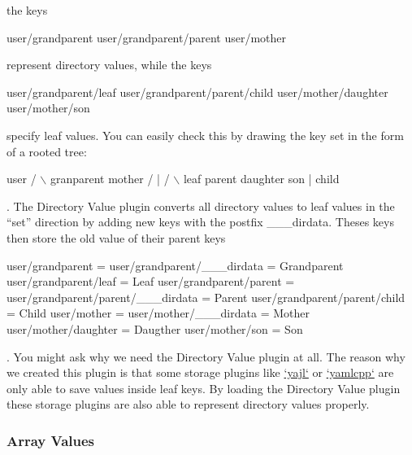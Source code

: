 the keys


\begin{DoxyCode}
user/grandparent
user/grandparent/parent
user/mother
\end{DoxyCode}


represent directory values, while the keys


\begin{DoxyCode}
user/grandparent/leaf
user/grandparent/parent/child
user/mother/daughter
user/mother/son
\end{DoxyCode}


specify leaf values. You can easily check this by drawing the key set in the form of a rooted tree\+:


\begin{DoxyCode}
             user
      /               \(\backslash\)
  granparent        mother
  /      |          /    \(\backslash\)
leaf  parent    daughter son
         |
       child
\end{DoxyCode}


. The Directory Value plugin converts all directory values to leaf values in the “set” direction by adding new keys with the postfix {\ttfamily \+\_\+\+\_\+\+\_\+dirdata}. Theses keys then store the old value of their parent keys


\begin{DoxyCode}
user/grandparent                    =
user/grandparent/\_\_\_dirdata         = Grandparent
user/grandparent/leaf               = Leaf
user/grandparent/parent             =
user/grandparent/parent/\_\_\_dirdata  = Parent
user/grandparent/parent/child       = Child
user/mother                         =
user/mother/\_\_\_dirdata              = Mother
user/mother/daughter                = Daugther
user/mother/son                     = Son
\end{DoxyCode}


. You might ask why we need the Directory Value plugin at all. The reason why we created this plugin is that some storage plugins like \hyperlink{md_src_plugins_yajl_README_src_plugins_yajl_README_md}{`yajl`} or \hyperlink{md_src_plugins_yajl_README_src_plugins_yajl_README_md}{`yamlcpp`} are only able to save values inside leaf keys. By loading the Directory Value plugin these storage plugins are also able to represent directory values properly.

\subsubsection*{Array Values}

